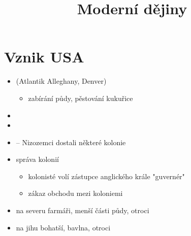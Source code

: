 \title{Moderní dějiny}


\section{Vznik USA}
\begin{itemize}
\item {} (Atlantik \ra Alleghany, Denver)
	\begin{itemize}
	\item zabírání půdy, pěstování kukuřice
	\end{itemize}
\item {}
\item {}
\item {} -- Nizozemci dostali některé kolonie
\item správa kolonií
	\begin{itemize}
	\item kolonisté volí zástupce anglického krále \ra "guvernér"
	\item zákaz obchodu mezi koloniemi
	\end{itemize}
\item na severu farmáři, menší části půdy, otroci
\item na jihu bohatší, bavlna, otroci
\end{itemize}

